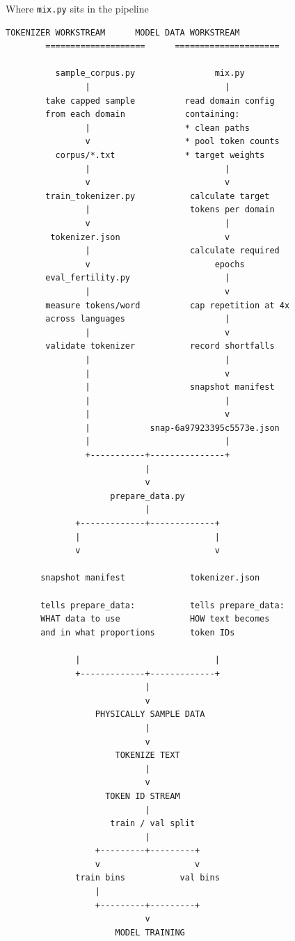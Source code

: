 \begin{paragraphblock}{Where \texttt{mix.py} sits in the pipeline}
\begin{lstlisting}[style=shadedpython,language={},basicstyle=\scriptsize\ttfamily]
        TOKENIZER WORKSTREAM      MODEL DATA WORKSTREAM
        ====================      =====================

          sample_corpus.py                mix.py
                |                           |
        take capped sample          read domain config
        from each domain            containing:
                |                   * clean paths
                v                   * pool token counts
          corpus/*.txt              * target weights
                |                           |
                v                           v
        train_tokenizer.py           calculate target
                |                    tokens per domain
                v                           |
         tokenizer.json                     v
                |                    calculate required
                v                         epochs
        eval_fertility.py                   |
                |                           v
        measure tokens/word          cap repetition at 4x
        across languages                    |
                |                           v
        validate tokenizer           record shortfalls
                |                           |
                |                           v
                |                    snapshot manifest
                |                           |
                |                           v
                |            snap-6a97923395c5573e.json
                |                           |
                +-----------+---------------+
                            |
                            v
                     prepare_data.py
                            |
              +-------------+-------------+
              |                           |
              v                           v

       snapshot manifest             tokenizer.json

       tells prepare_data:           tells prepare_data:
       WHAT data to use              HOW text becomes
       and in what proportions       token IDs

              |                           |
              +-------------+-------------+
                            |
                            v
                  PHYSICALLY SAMPLE DATA
                            |
                            v
                      TOKENIZE TEXT
                            |
                            v
                    TOKEN ID STREAM
                            |
                     train / val split
                            |
                  +---------+---------+
                  v                   v
              train bins           val bins
                  |
                  +---------+---------+
                            v
                      MODEL TRAINING
\end{lstlisting}


\end{paragraphblock}

